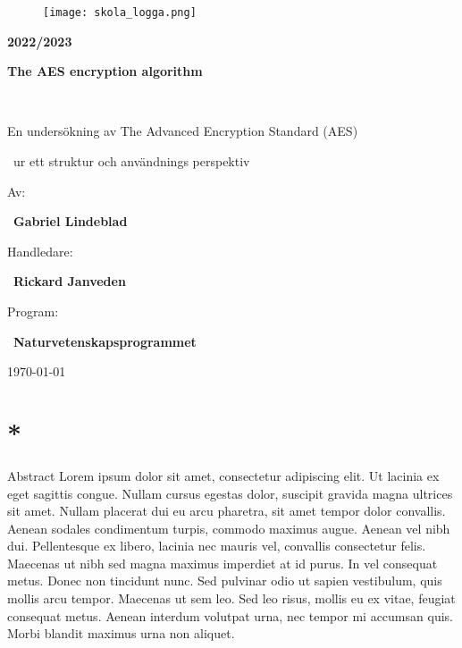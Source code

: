 \documentclass[a4paper, 12pt]{report}
\newcommand\BackgroundIm{
\put(0,0){
\parbox[b][\paperheight]{\paperwidth}{
\vfill
\centering
\texttt{[image: background-1.png]}
\vfill
}}}
\newcommand{\currentchapter}{}
\newcommand{\mychapter}[1]{\chapter{#1}
\renewcommand{\currentchapter}{#1}}
\begin{document}

\begin{titlepage}
    \AddToShipoutPicture*{\BackgroundIm}

    \begin{figure}[H]
    \texttt{[image: skola\_logga.png]}
    \end{figure}

    \raggedleft

    \vspace{-3.5cm}
    {\large \textbf{2022/2023}}

    \raggedright

    \vspace{3.5cm}
	{\huge\bfseries The AES encryption algorithm\par}
    \vspace{0.1cm}
    ~{\large En undersökning av The Advanced Encryption Standard (AES) \par
    ~ur ett struktur och användnings perspektiv}

    \vfill

    Av:\par
    ~\textbf{Gabriel Lindeblad}

    \vspace{0.2cm}

	{Handledare:}\par
	~\textbf{Rickard Janveden}

    \vspace{0.2cm}

    Program:\par
    ~\textbf{Naturvetenskapsprogrammet}

    \vspace{1cm}
	{\large \today\par}
    \vspace{-1cm}
\end{titlepage}


\mychapter*{Abstract}
Lorem ipsum dolor sit amet, consectetur adipiscing elit. Ut lacinia ex eget sagittis congue.
Nullam cursus egestas dolor, suscipit gravida magna ultrices sit amet. Nullam placerat dui eu
arcu pharetra, sit amet tempor dolor convallis. Aenean sodales condimentum turpis, commodo maximus
augue. Aenean vel nibh dui. Pellentesque ex libero, lacinia nec mauris vel, convallis consectetur
felis. Maecenas ut nibh sed magna maximus imperdiet at id purus. In vel consequat metus. Donec non
tincidunt nunc. Sed pulvinar odio ut sapien vestibulum, quis mollis arcu tempor. Maecenas ut sem leo.
Sed leo risus, mollis eu ex vitae, feugiat consequat metus. Aenean interdum volutpat urna, nec
tempor mi accumsan quis. Morbi blandit maximus urna non aliquet.


\tableofcontents














\end{document}
